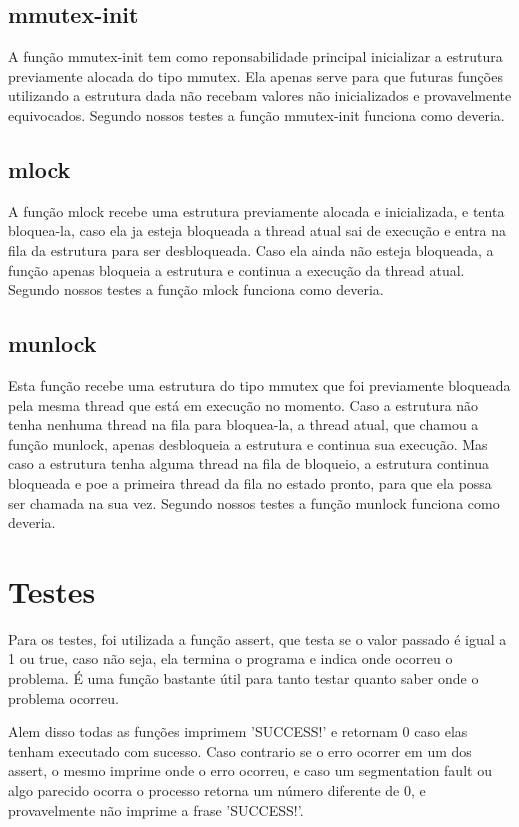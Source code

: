 \documentclass[12pt,a4paper]{report}
\begin{document}
\section{mmutex-init}
	A função mmutex-init tem como reponsabilidade principal inicializar a estrutura previamente alocada do tipo mmutex. Ela apenas serve para que futuras funções utilizando a estrutura dada não recebam valores não inicializados e provavelmente equivocados. Segundo nossos testes a função mmutex-init funciona como deveria.
	
\section{mlock}
	A função mlock recebe uma estrutura previamente alocada e inicializada, e tenta bloquea-la, caso ela ja esteja bloqueada a thread atual sai de execução e entra na fila da estrutura para ser desbloqueada. Caso ela ainda não esteja bloqueada, a função apenas bloqueia a estrutura e continua a execução da thread atual. Segundo nossos testes a função mlock funciona como deveria.
	
\section{munlock}
	Esta função recebe uma estrutura do tipo mmutex que foi previamente bloqueada pela mesma thread que está em execução no momento. Caso a estrutura não tenha nenhuma thread na fila para bloquea-la, a thread atual, que chamou a função munlock, apenas desbloqueia a estrutura e continua sua execução. Mas caso a estrutura tenha alguma thread na fila de bloqueio, a estrutura continua bloqueada e poe a primeira thread da fila no estado pronto, para que ela possa ser chamada na sua vez. Segundo nossos testes a função munlock funciona como deveria.


\chapter{Testes}
	Para os testes, foi utilizada a função assert, que testa se o valor passado é igual a 1 ou true, caso não seja, ela termina o programa e indica onde ocorreu o problema. É uma função bastante útil para tanto testar quanto saber onde o problema ocorreu.
	
	Alem disso todas as funções imprimem 'SUCCESS!' e retornam 0 caso elas tenham executado com sucesso. Caso contrario se o erro ocorrer em um dos assert, o mesmo imprime onde o erro ocorreu, e caso um segmentation fault ou algo parecido ocorra o processo retorna um número diferente de 0, e provavelmente não imprime a frase 'SUCCESS!'.
	
\end{document}
